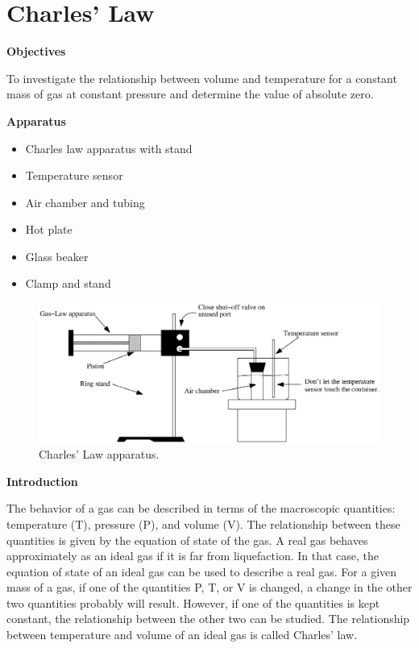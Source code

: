 
\section{Charles' Law}

\makelabheader %

\textbf{Objectives} 

To investigate the relationship between volume and temperature for
a constant mass of gas at constant pressure and determine the value
of absolute zero.

\textbf{Apparatus} 

\begin{itemize}
\item Charles law apparatus with stand
\item Temperature sensor
\item Air chamber and tubing
\item Hot plate
\item Glass beaker
\item Clamp and stand
\end{itemize}
\vspace{0.3cm}

\begin{figure}[hbt]
\begin{center}
\includegraphics[width=6.0in]{charles_law/charles_law_fig1.eps}
\caption{Charles' Law apparatus.}
\end{center}
\end{figure}

\textbf{Introduction}

The behavior of a gas can be described in terms of the macroscopic quantities:
temperature (T), pressure (P), and volume (V). The relationship between these
quantities is given by the equation of state of the gas. A real gas behaves
approximately as an ideal gas if it is far from liquefaction. In that case,
the equation of state of an ideal gas can be used to describe a real gas. For
a given mass of a gas, if one of the quantities P, T, or V is changed, a change
in the other two quantities probably will result. However, if one of the quantities
is kept constant, the relationship between the other two can be studied. The
relationship between temperature and volume of an ideal gas is called Charles' law.

